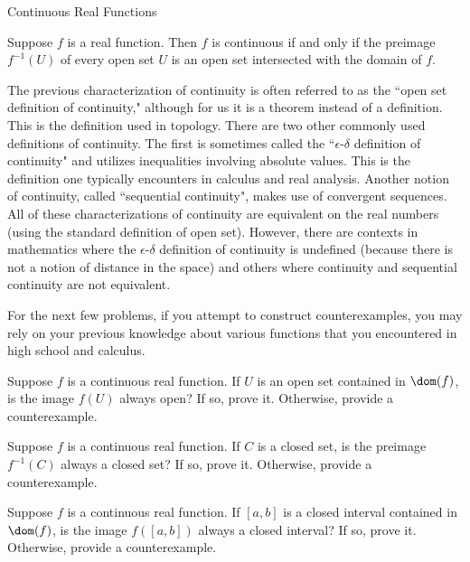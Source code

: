 \begin{section}{Continuous Real Functions}
\begin{theorem}\label{thm:inverse images open sets}
Suppose $f$ is a real function. Then $f$ is continuous if and only if the preimage $f^{-1}(U)$ of every open set $U$ is an open set intersected with the domain of $f$.
\end{theorem}

The previous characterization of continuity is often referred to as the ``open set definition of continuity," although for us it is a theorem instead of a definition. This is the definition used in topology. There are two other commonly used definitions of continuity. The first is sometimes called the ``$\epsilon$-$\delta$ definition of continuity" and utilizes inequalities involving absolute values. This is the definition one typically encounters in calculus and real analysis. Another notion of continuity, called ``sequential continuity", makes use of convergent sequences.  All of these characterizations of continuity are equivalent on the real numbers (using the standard definition of open set). However, there are contexts in mathematics where the $\epsilon$-$\delta$ definition of continuity is undefined (because there is not a notion of distance in the space) and others where continuity and sequential continuity are not equivalent.

For the next few problems, if you attempt to construct counterexamples, you may rely on your previous knowledge about various functions that you encountered in high school and calculus.

\begin{problem}
Suppose $f$ is a continuous real function. If $U$ is an open set contained in $\dom(f)$, is the image $f(U)$ always open?  If so, prove it.  Otherwise, provide a counterexample.
\end{problem}


\begin{problem}
Suppose $f$ is a continuous real function. If $C$ is a closed set, is the preimage $f^{-1}(C)$ always a closed set? If so, prove it.  Otherwise, provide a counterexample.
\end{problem}

\begin{problem}
Suppose $f$ is a continuous real function. If $[a,b]$ is a closed interval contained in $\dom(f)$, is the image $f([a,b])$ always a closed interval?  If so, prove it.  Otherwise, provide a counterexample.
\end{problem}


\end{section}
